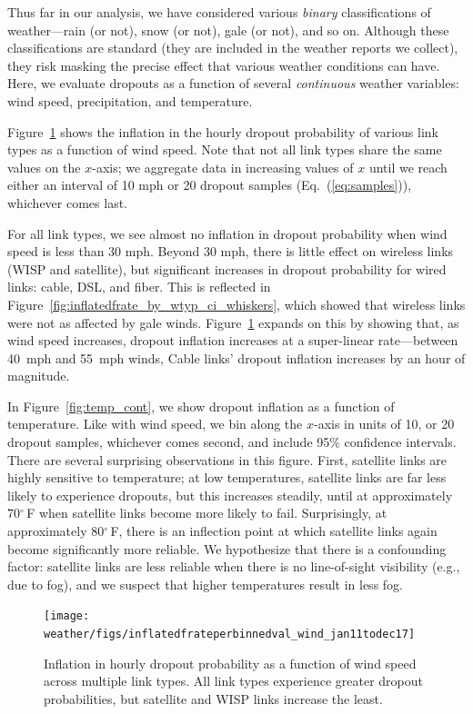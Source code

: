 Thus far in our analysis, we have considered various \emph{binary}
classifications of weather---rain (or not), snow (or not), gale (or
not), and so on.
%
Although these classifications are standard (they are included in the
weather reports we collect), they risk masking the precise effect that
various weather conditions can have.
%
Here, we evaluate dropouts as a function of several \emph{continuous}
weather variables: wind speed, precipitation, and temperature.


Figure~\ref{fig:wind_cont} shows the inflation in the hourly dropout
probability of various link types as a function of wind speed.
%
Note that not all link types share the same values on the $x$-axis;
we aggregate data in increasing values of $x$ until we reach either an
interval of 10 mph or 20 dropout samples (Eq.~(\ref{eq:samples})), whichever comes last.


For all link types, we see almost no inflation in dropout probability
when wind speed is less than 30 mph.
%
Beyond 30 mph, there is little effect on wireless links (WISP and
satellite), but significant increases in dropout probability for wired
links: cable, DSL, and fiber.
%
This is reflected in
Figure~\ref{fig:inflatedfrate_by_wtyp_ci_whiskers}, which showed that
wireless links were not as affected by gale winds.
%
Figure~\ref{fig:wind_cont} expands on this by showing that, as wind speed
increases, dropout inflation increases at a super-linear rate---between
40~mph and 55~mph winds, Cable links' dropout inflation increases by an
hour of magnitude.


In Figure~\ref{fig:temp_cont}, we show dropout inflation as a function
of temperature.
%
Like with wind speed, we bin along the $x$-axis in units of 10, or
20 dropout samples, whichever comes second, and include 95\% confidence
intervals.
%
There are several surprising observations in this figure.
%
First, satellite links are highly sensitive to temperature; at low
temperatures, satellite links are far less likely to experience
dropouts, but this increases steadily, until at approximately
70$^\circ$\,F when satellite links become more likely to fail.
%
Surprisingly, at approximately 80$^\circ$\,F, there is an inflection point at
which satellite links again become significantly more reliable.
%
We hypothesize that there is a confounding factor: satellite links are
less reliable when there is no line-of-sight visibility (e.g., due to
fog), and we suspect that higher temperatures result in less fog.


\begin{figure}[t]
\centering
\texttt{[image: weather/figs/inflatedfrateperbinnedval\_wind\_jan11todec17]}
\caption[Inflation in hourly dropout probability as a function of wind
speed across link types]{
\label{fig:wind_cont}
\figdone
Inflation in hourly dropout probability as a function of wind speed
	across multiple link types. All link types experience greater
	dropout probabilities, but satellite and WISP links increase the
	least.  }
\end{figure}

